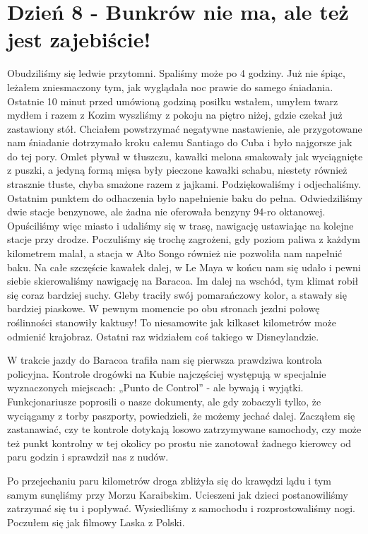 
\chapter[Bunkrów nie ma, ale też jest zajebiście!]{Dzień 8 - Bunkrów nie ma, ale też jest zajebiście!}

Obudziliśmy się ledwie przytomni.
Spaliśmy może po 4 godziny.
Już nie śpiąc, leżałem zniesmaczony tym, jak wyglądała noc prawie do samego śniadania.
Ostatnie 10 minut przed umówioną godziną posiłku wstałem, umyłem twarz mydłem i razem z Kozim wyszliśmy z pokoju na piętro niżej, gdzie czekał już zastawiony stół.
Chciałem powstrzymać negatywne nastawienie, ale przygotowane nam śniadanie dotrzymało kroku całemu Santiago do Cuba i było najgorsze jak do tej pory.
Omlet pływał w tłuszczu, kawałki melona smakowały jak wyciągnięte z puszki, a jedyną formą mięsa były pieczone kawałki schabu, niestety również strasznie tłuste, chyba smażone razem z jajkami.
Podziękowaliśmy i odjechaliśmy.
Ostatnim punktem do odhaczenia było napełnienie baku do pełna.
Odwiedziliśmy dwie stacje benzynowe, ale żadna nie oferowała benzyny 94-ro oktanowej.
Opuściliśmy więc miasto i udaliśmy się w trasę, nawigację ustawiając na kolejne stacje przy drodze.
Poczuliśmy się trochę zagrożeni, gdy poziom paliwa z każdym kilometrem malał, a stacja w Alto Songo również nie pozwoliła nam napełnić baku.
Na całe szczęście kawałek dalej, w Le Maya w końcu nam się udało i pewni siebie skierowaliśmy nawigację na Baracoa.
Im dalej na wschód, tym klimat robił się coraz bardziej suchy.
Gleby traciły swój pomarańczowy kolor, a stawały się bardziej piaskowe.
W pewnym momencie po obu stronach jezdni połowę roślinności stanowiły kaktusy!
To niesamowite jak kilkaset kilometrów może odmienić krajobraz.
Ostatni raz widziałem coś takiego w Disneylandzie.
\par W trakcie jazdy do Baracoa trafiła nam się pierwsza prawdziwa kontrola policyjna.
Kontrole drogówki na Kubie najczęściej występują w specjalnie wyznaczonych miejscach: „Punto de Control” - ale bywają i wyjątki.
Funkcjonariusze poprosili o nasze dokumenty, ale gdy zobaczyli tylko, że wyciągamy z torby paszporty, powiedzieli, że możemy jechać dalej.
Zacząłem się zastanawiać, czy te kontrole dotykają losowo zatrzymywane samochody, czy może też punkt kontrolny w tej okolicy po prostu nie zanotował żadnego kierowcy od paru godzin i sprawdził nas z nudów.
\par Po przejechaniu paru kilometrów droga zbliżyła się do krawędzi lądu i tym samym sunęliśmy przy Morzu Karaibskim.
Ucieszeni jak dzieci postanowiliśmy zatrzymać się tu i popływać.
Wysiedliśmy z samochodu i rozprostowaliśmy nogi.
Poczułem się jak filmowy Laska z Polski.

